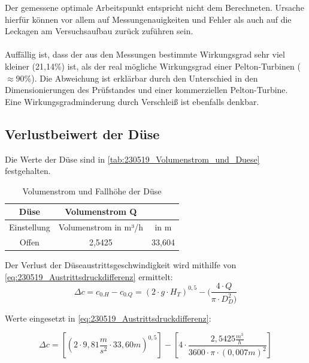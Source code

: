 Der gemessene optimale Arbeitspunkt entspricht nicht dem Berechneten. Ursache hierfür können vor allem auf Messungenauigkeiten und Fehler als auch auf die Leckagen am Versuchsaufbau zurück zuführen sein. \\\\ Auffällig ist, dass der aus den Messungen bestimmte Wirkungsgrad sehr viel kleiner (21,14\%) ist, als der real mögliche Wirkungsgrad einer Pelton-Turbinen ($\approx90\%$). Die Abweichung ist erklärbar durch den  Unterschied in den Dimensionierungen des Prüfstandes und einer kommerziellen Pelton-Turbine. Eine Wirkungsgradminderung durch Verschleiß ist ebenfalls denkbar.

\newpage
\subsection{Verlustbeiwert der Düse}

Die Werte der Düse sind in \autoref{tab:230519_Volumenstrom_und_Duese} festgehalten.

\begin{table}[!ht]
\centering
\caption{Volumenstrom und Fallhöhe der Düse}
\label{tab:230519_Volumenstrom_und_Duese}
\begin{tabular}{|c|c|c|}
\hline
\rowcolor[HTML]{70AD47} 
{\color[HTML]{FFFFFF} Düse}         & {\color[HTML]{FFFFFF} Volumenstrom Q}          & \cellcolor[HTML]{70AD47}{\color[HTML]{FFFFFF}Fallhöhe $H_{T}$ }\\ \hline
\cellcolor[HTML]{A9D08E}Einstellung & \cellcolor[HTML]{5B9BD5}Volumenstrom   in m³/h & \cellcolor[HTML]{5B9BD5}in m              \\ \hline
\rowcolor[HTML]{DDEBF7} 
\cellcolor[HTML]{CFE5A8}Offen       & 2,5425                                         & 33,604                                    \\ \hline
\end{tabular}
\end{table}

Der Verlust der Düseaustrittsgeschwindigkeit wird mithilfe von \autoref{eq:230519_Austrittsdruckdifferenz} ermittelt:
\begin{equation}
\Delta c = c_{0.H} - c_{0.Q} = ( 2\cdot g \cdot H_T)^{0,5} - (\frac{4\cdot Q}{\pi \cdot D_D^2)}
\label{eq:230519_Austrittsdruckdifferenz}
\end{equation}

Werte eingesetzt in \autoref{eq:230519_Austrittsdruckdifferenz}:

$$\Delta c =[( 2\cdot 9,81 \frac{m}{s^2} \cdot 33,60m
)^{0,5}] -[ 4\cdot \frac{2,5425\frac{m^3}{h}}{3600\cdot \pi \cdot (0,007m)^2}] $$

